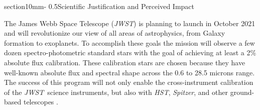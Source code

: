 \documentclass[letterpaper,12pt]{article}
\makeatletter
\renewcommand{\section}{\@startsection%
{section}{1}{0mm}{-\baselineskip}%
{0.5\baselineskip}{\normalfont\Large\bfseries}}%
\newcommand{\jwst}{{\it JWST}}
\newcommand{\spitzer}{{\it Spitzer}}
\newcommand{\hst}{{\it HST}}
\newcommand{\swift}{{\it Swift}}
\newcommand{\fermi}{{\it Fermi}}
\makeatother
\begin{document}




\section{Scientific Justification and Perceived Impact}

The James Webb Space Telescope (\jwst) is planning to launch in October 2021 and will revolutionize our view of all areas of astrophysics, from Galaxy formation to exoplanets. To accomplish these goals the mission will observe a few dozen spectro-photometric standard stars with the goal of achieving at least a 2\% absolute flux calibration. These calibration stars are chosen because they have well-known absolute flux and spectral shape across the 0.6 to 28.5 microns range. The success of this program will not only enable the cross-instrument calibration of the \jwst\ science instruments, but also with \hst, \spitzer, and other ground-based telescopes \citep{Bohlin2014PASP}.
\end{document}
